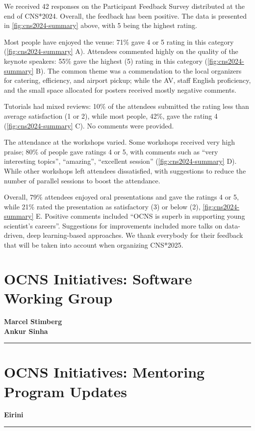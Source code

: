 \documentclass[11pt,a4paper,oneside]{article}
\begin{document}
\noindent{}We received 42 responses on the Participant Feedback Survey distributed at the end of CNS*2024.
Overall, the feedback has been positive. The data is presented in \cref{fig:cns2024-summary} above, with 5 being the highest rating.

Most people have enjoyed the venue: 71\% gave 4 or 5 rating in this category (\cref{fig:cns2024-summary} A).
Attendees commented highly on the quality of the keynote speakers: 55\% gave the highest (5) rating in this category (\cref{fig:cns2024-summary} B).
The common theme was a commendation to the local organizers for catering, efficiency, and airport pickup; while the AV, staff English proficiency, and the small space allocated for posters received mostly negative comments.

Tutorials had mixed reviews: 10\% of the attendees submitted the rating less than average satisfaction (1 or 2), while most people, 42\%, gave the rating 4 (\cref{fig:cns2024-summary} C). No comments were provided.

The attendance at the workshops varied.
Some workshops received very high praise; 80\% of people gave ratings 4 or 5, with comments such as \enquote{very interesting topics}, \enquote{amazing}, \enquote{excellent session} (\cref{fig:cns2024-summary} D).
While other workshops left attendees dissatisfied, with suggestions to reduce the number of parallel sessions to boost the attendance.

Overall, 79\% attendees enjoyed oral presentations and gave the ratings 4 or 5, while 21\% rated the presentation as satisfactory (3) or below (2), \cref{fig:cns2024-summary} E.
Positive comments included \enquote{OCNS is superb in supporting young scientist's careers}.
Suggestions for improvements included more talks on data-driven, deep learning-based approaches.
We thank everybody for their feedback that will be taken into account when organizing CNS*2025.


\newpage
\section*{OCNS Initiatives: Software Working Group}%
\textbf{\large Marcel Stimberg \\
Ankur Sinha\\}
\rule{\textwidth}{0.4pt}
\lipsum[1-3]

\newpage
\section*{OCNS Initiatives: Mentoring Program Updates}%
\textbf{\large Eirini\\}
\rule{\textwidth}{0.4pt}
\lipsum[1-3]
\end{document}
